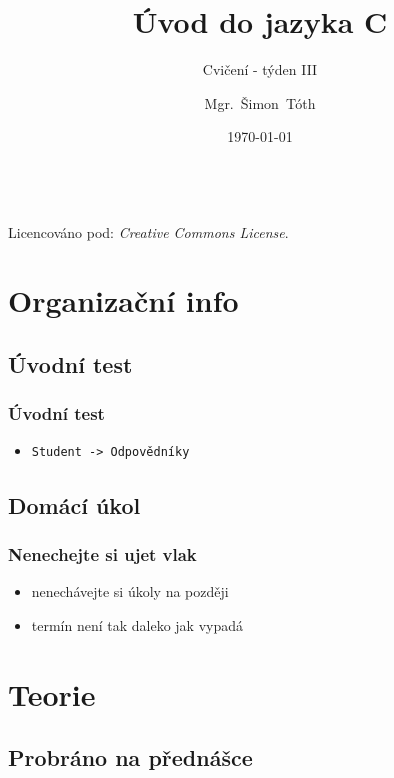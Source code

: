 

\title{Úvod do jazyka C}
\subtitle{Cvičení - týden III}
\author[]{Mgr.~Šimon~Tóth}
\date{\today}

\newcommand{\CcNote}[1]{%
        Licencováno pod: \textit{Creative Commons #1 3.0 License}.%
}


	\begin{frame}
		\titlepage
		\vfill
		\begin{center}
			\\
			{\tiny\CcNote{\CcLongnameByNcSa}}
			\vspace*{2ex}
		\end{center}
	\end{frame}

\section{Organizační info}
\subsection{Úvodní test}

\begin{frame}
	\frametitle{Úvodní test}
	\begin{itemize}
		\item{\texttt{Student -> Odpovědníky}}
	\end{itemize}
\end{frame}

\subsection{Domácí úkol}

\begin{frame}
	\frametitle{Nenechejte si ujet vlak}
	\begin{itemize}
		\item{nenechávejte si úkoly na později}
		\item{termín není tak daleko jak vypadá}
	\end{itemize}
\end{frame}

\section{Teorie}

\subsection{Probráno na přednášce}

